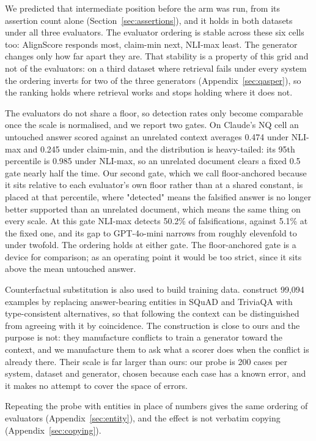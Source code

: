 \documentclass[11pt]{article}
\begin{document}
We predicted that intermediate position before the arm was run, from its assertion count alone (Section~\ref{sec:assertions}), and it holds in both datasets under all three evaluators. The evaluator ordering is stable across these six cells too: AlignScore responds most, claim-min next, NLI-max least. The generator changes only how far apart they are. That stability is a property of this grid and not of the evaluators: on a third dataset where retrieval fails under every system the ordering inverts for two of the three generators (Appendix~\ref{sec:qasper}), so the ranking holds where retrieval works and stops holding where it does not.

The evaluators do not share a floor, so detection rates only become comparable once the scale is normalised, and we report two gates. On Claude's NQ cell an untouched answer scored against an unrelated context averages 0.474 under NLI-max and 0.245 under claim-min, and the distribution is heavy-tailed: its 95th percentile is 0.985 under NLI-max, so an unrelated document clears a fixed 0.5 gate nearly half the time. Our second gate, which we call floor-anchored because it sits relative to each evaluator's own floor rather than at a shared constant, is placed at that percentile, where "detected" means the falsified answer is no longer better supported than an unrelated document, which means the same thing on every scale. At this gate NLI-max detects 50.2\% of falsifications, against 5.1\% at the fixed one, and its gap to GPT-4o-mini narrows from roughly elevenfold to under twofold. The ordering holds at either gate. The floor-anchored gate is a device for comparison; as an operating point it would be too strict, since it sits above the mean untouched answer.



Counterfactual substitution is also used to build training data. \citet{ju-etal-2026} construct 99,094 examples by replacing answer-bearing entities in SQuAD and TriviaQA with type-consistent alternatives, so that following the context can be distinguished from agreeing with it by coincidence. The construction is close to ours and the purpose is not: they manufacture conflicts to train a generator toward the context, and we manufacture them to ask what a scorer does when the conflict is already there. Their scale is far larger than ours: our probe is 200 cases per system, dataset and generator, chosen because each case has a known error, and it makes no attempt to cover the space of errors.

Repeating the probe with entities in place of numbers gives the same ordering of evaluators (Appendix~\ref{sec:entity}), and the effect is not verbatim copying (Appendix~\ref{sec:copying}).
\end{document}
